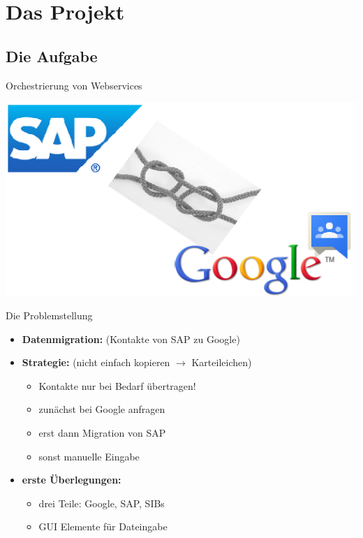\section{Das Projekt}
\subsection*{Die Aufgabe}



\begin{frame}{Orchestrierung von Webservices}
	
\begin{center}
\includegraphics[width=\textheight]{Bilder/titel_einfuehrung_logos.png} 
\end{center}

\end{frame}

\begin{frame}{Die Problemstellung}
\begin{itemize}[<+->]
	\item \textbf{Datenmigration:} (Kontakte von SAP zu Google)
	\pause
	\item \textbf{Strategie:} (nicht einfach kopieren $\rightarrow$ Karteileichen)
		\begin{itemize}[<+->]
			\item Kontakte nur bei Bedarf übertragen!
			\pause
			\item zunächst bei Google anfragen
			\item erst dann Migration von SAP
			\item sonst manuelle Eingabe
		\end{itemize}
	\pause
	\item \textbf{erste Überlegungen:}
		\begin{itemize}[<+->]
			\item drei Teile: Google, SAP, SIBs
			\item GUI Elemente für Dateingabe
		\end{itemize}
\end{itemize}
\end{frame}



